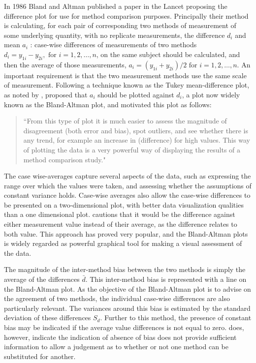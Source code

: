 \documentclass[12pt, a4paper]{report}
\theoremstyle{plain}
\theoremstyle{definition}
\theoremstyle{remark}
\begin{document}
	
In 1986 Bland and Altman published a paper in the Lancet proposing the difference plot for use for method comparison purposes. Principally their method is calculating, for each pair of corresponding two methods of measurement of some underlying quantity, with no replicate measurements, the difference $d_i$ and mean $a_i$ : case-wise differences of measurements of two methods $d_{i} =
y_{1i}-y_{2i}, \mbox{ for }i=1,2,\dots,n$, on the same subject
should be calculated, and then the average of those measurements, 
$a_{i} = (y_{1i} + y_{2i})/2 \mbox{ for }i=1,2,\dots, n$. An important requirement is that the	two measurement methods use the same scale of measurement. Following a technique known as the Tukey mean-difference plot, as noted by \citet{kozak2014including}, \citet{BA83} proposed that $a_i$ should be plotted against $d_i$, a plot now widely known as the Bland-Altman plot, and motivated this plot as follows:
	\begin{quote}
		``From this type of plot it is much easier to assess the magnitude
		of disagreement (both error and bias), spot outliers, and see
		whether there is any trend, for example an increase in (difference) for high values. This way of plotting the data is a very powerful way of displaying the results of a method comparison study."
	\end{quote}
	
	The case wise-averages capture several aspects of the data, such as expressing the range over which the values were taken, and assessing whether the assumptions of constant variance holds. Case-wise averages also allow the case-wise differences to be presented on a two-dimensional plot, with better data visualization qualities than a one dimensional plot. \citet{BA86}
	cautions that it would be the difference against either measurement value instead of their average, as the difference relates to both value. This approach has proved very popular, and the Bland-Altman plots is widely regarded as powerful graphical tool for making a visual assessment of the data.
	
	The magnitude of the inter-method bias between the two methods is simply the average of the differences $\bar{d}$. This inter-method bias is represented with a line on the Bland-Altman plot. As the objective of the Bland-Altman plot is to advise on the agreement of two methods, the individual case-wise differences are also particularly relevant. The variances around this bias is estimated by the standard deviation of these differences $S_{d}$. Further to this method, the presence of constant bias may be
	indicated if the average value differences is not equal to zero. \citet{BA86} does, however, indicate the indication of absence of bias does not provide sufficient information to allow a	judgement as to whether or not one method can be substituted for
	another.
	
\end{document}
